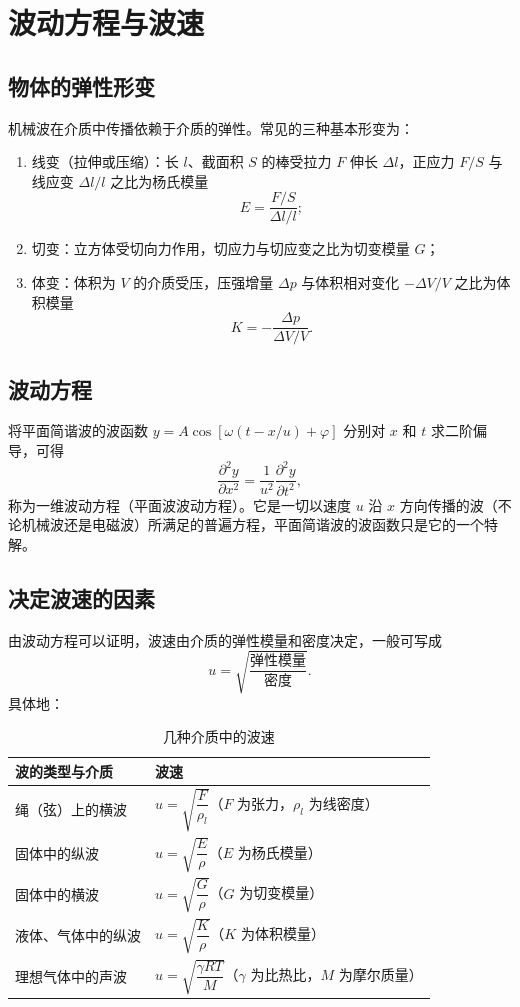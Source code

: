 
\section{波动方程与波速}
    \subsection{物体的弹性形变}
    机械波在介质中传播依赖于介质的弹性。常见的三种基本形变为：
    \begin{enumerate}
        \item 线变（拉伸或压缩）：长 $l$、截面积 $S$ 的棒受拉力 $F$ 伸长 $\Delta l$，正应力 $F/S$ 与线应变 $\Delta l/l$ 之比为杨氏模量
        \[
        E=\frac{F/S}{\Delta l/l};
        \]
        \item 切变：立方体受切向力作用，切应力与切应变之比为切变模量 $G$；
        \item 体变：体积为 $V$ 的介质受压，压强增量 $\Delta p$ 与体积相对变化 $-\Delta V/V$ 之比为体积模量
        \[
        K=-\frac{\Delta p}{\Delta V/V}.
        \]
    \end{enumerate}

    \subsection{波动方程}
    将平面简谐波的波函数 $y=A\cos[\omega(t-x/u)+\varphi]$ 分别对 $x$ 和 $t$ 求二阶偏导，可得
    \[
    \frac{\partial^{2}y}{\partial x^{2}}=\frac{1}{u^{2}}\frac{\partial^{2}y}{\partial t^{2}},
    \]
    称为一维波动方程（平面波波动方程）。它是一切以速度 $u$ 沿 $x$ 方向传播的波（不论机械波还是电磁波）所满足的普遍方程，平面简谐波的波函数只是它的一个特解。

    \subsection{决定波速的因素}
    由波动方程可以证明，波速由介质的弹性模量和密度决定，一般可写成
    \[
    u=\sqrt{\frac{\text{弹性模量}}{\text{密度}}}.
    \]
    具体地：
    \begin{table}[htbp]
    \centering
    \caption{几种介质中的波速}
    \begin{tabular}{ll}
    \toprule
    波的类型与介质 & 波速 \\
    \midrule
    绳（弦）上的横波 & $u=\sqrt{\dfrac{F}{\rho_l}}$（$F$ 为张力，$\rho_l$ 为线密度） \\
    固体中的纵波 & $u=\sqrt{\dfrac{E}{\rho}}$（$E$ 为杨氏模量） \\
    固体中的横波 & $u=\sqrt{\dfrac{G}{\rho}}$（$G$ 为切变模量） \\
    液体、气体中的纵波 & $u=\sqrt{\dfrac{K}{\rho}}$（$K$ 为体积模量） \\
    理想气体中的声波 & $u=\sqrt{\dfrac{\gamma RT}{M}}$（$\gamma$ 为比热比，$M$ 为摩尔质量） \\
    \bottomrule
    \end{tabular}
    \end{table}

